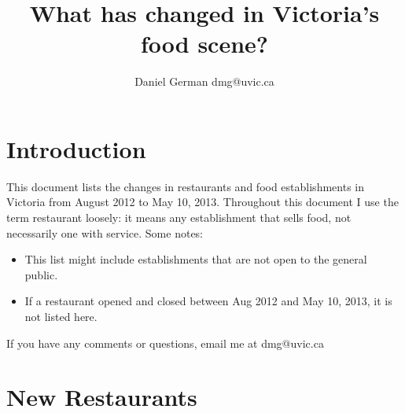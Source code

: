 \documentclass[9pt]{article}
\author{Daniel German dmg@uvic.ca}
\begin{document}
\title{What has changed in Victoria's food scene?}

\maketitle

\section{Introduction}

This document lists the changes in restaurants and food establishments
in Victoria from August 2012 to May 10, 2013.  Throughout this
document I use the term restaurant loosely: it means any establishment
that sells food, not necessarily one with service. Some notes:


\begin{itemize}
\item This list might include establishments that are not open to the general public. 
\item If a restaurant opened and closed between Aug 2012 and May 10, 2013, it is not listed here.
\end{itemize}

If you have any comments or questions, email me at dmg@uvic.ca


\section{New Restaurants}
\end{document}
